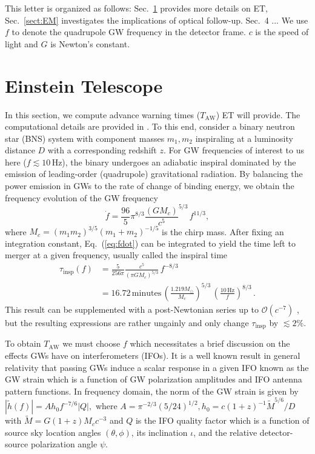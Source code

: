 \documentclass{aa}
\newcommand{\be}{\begin{equation}}
\newcommand{\ee}{\end{equation}}
\newcommand{\f}{\frac}
\newcommand{\nn}{\nonumber}
\newcommand{\ord}{\mathcal{O}}
\begin{document}
This letter is organized as follows: Sec.~\ref{sect:et} provides more details on ET,
Sec.~\ref{sect:EM} investigates the implications
of optical follow-up. Sec.~4 ...
We use $f$ to denote the quadrupole GW frequency
in the detector frame. $c$ is the speed of light and $G$ is Newton's constant.
\section{Einstein Telescope}
\label{sect:et}
In this section, we compute advance warning times ($T_\text{AW}$) ET will provide.
The computational details are provided in \cite{Akcay18}.
To this end, consider a binary neutron star (BNS) system with component masses
$m_1, m_2$ inspiraling at a luminosity distance $D$ with a corresponding redshift $z$. For GW frequencies of interest to us here ($f \lesssim 10\,$Hz), the binary undergoes an adiabatic inspiral dominated by
the emission of leading-order (quadrupole)
gravitational radiation. By balancing the
power emission in GWs to the rate of change of binding energy, we obtain the frequency evolution of the GW frequency
%
\be
\dot{f} = \f{96}{5}\pi^{8/3} \f{(G M_c)}{c^5}^{5/3}\, f^{11/3}, \label{eq:fdot}
\ee
where $M_c  = {(m_1 m_2)^{3/5}}{(m_1+m_2)^{-1/5}} $ is the chirp mass.
After fixing an integration constant, Eq.~(\ref{eq:fdot})
can be integrated to yield the time left to merger at a given frequency, usually called the inspiral time
%
\begin{align}
\tau_\text{insp}(f) &= \f{5}{256\pi}\f{c^5}{(\pi G M_c)^{5/3}} \,f^{-8/3}\nn\\
&=16.72\,\text{minutes} \, \left(\f{1.219 M_\odot}{M_c}\right)^{5/3}\,\left(\f{10\,\text{Hz}}{f}\right)^{8/3}
\label{eq:tau_insp}\, .
\end{align}
%
This result can be supplemented with a post-Newtonian series up to $\ord(c^{-7})$ \citep{Blanchet_LRR}, but the resulting expressions
are rather ungainly and only change $\tau_\text{insp}$ by $\lesssim 2\%$.

To obtain $T_\text{AW}$ we must choose $f$
which necessitates a brief discussion on the
effects GWs have on interferometers (IFOs).
It is a well known result in general relativity that passing GWs induce a scalar response in a given IFO known as the GW strain which is a function of GW polarization amplitudes and IFO 
antenna pattern functions. In frequency domain, the norm of the GW strain is given by
%
$|\tilde{h}(f)|=A h_0 f^{-7/6} |Q|,$ %
%
where $A= \pi^{-2/3}(5/24)^{1/2}, h_0 = c  (1+z)^{-1}\tilde{M}^{5/6}/D$ with $\tilde{M}= G  (1+z)M_c c^{-3}$ and $Q$ is the IFO quality factor which is a function of source sky location angles $(\theta,\phi)$, its inclination $\iota$, and the relative detector-source polarization angle $\psi$.
\end{document}
